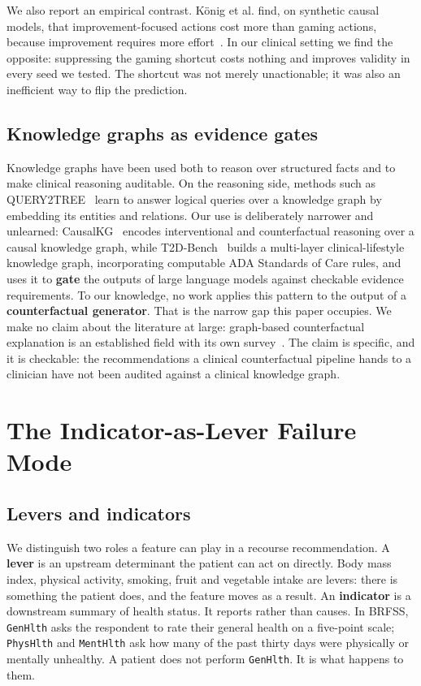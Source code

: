 \documentclass[conference]{IEEEtran}
\begin{document}
We also report an empirical contrast. K\"onig et al. find, on synthetic causal models, that improvement-focused actions cost more than gaming actions, because improvement requires more effort~\cite{konig2023}. In our clinical setting we find the opposite: suppressing the gaming shortcut costs nothing and improves validity in every seed we tested. The shortcut was not merely unactionable; it was also an inefficient way to flip the prediction.

\subsection{Knowledge graphs as evidence gates}
Knowledge graphs have been used both to reason over structured facts and to make clinical reasoning auditable. On the reasoning side, methods such as QUERY2TREE~\cite{query2tree2025} learn to answer logical queries over a knowledge graph by embedding its entities and relations. Our use is deliberately narrower and unlearned: CausalKG~\cite{causalkg2022} encodes interventional and counterfactual reasoning over a causal knowledge graph, while T2D-Bench~\cite{t2dbench2026} builds a multi-layer clinical-lifestyle knowledge graph, incorporating computable ADA Standards of Care rules, and uses it to \textbf{gate} the outputs of large language models against checkable evidence requirements. To our knowledge, no work applies this pattern to the output of a \textbf{counterfactual generator}. That is the narrow gap this paper occupies. We make no claim about the literature at large: graph-based counterfactual explanation is an established field with its own survey~\cite{pradoromero2024}. The claim is specific, and it is checkable: the recommendations a clinical counterfactual pipeline hands to a clinician have not been audited against a clinical knowledge graph.

\section{The Indicator-as-Lever Failure Mode}
\subsection{Levers and indicators}
We distinguish two roles a feature can play in a recourse recommendation. A \textbf{lever} is an upstream determinant the patient can act on directly. Body mass index, physical activity, smoking, fruit and vegetable intake are levers: there is something the patient does, and the feature moves as a result. An \textbf{indicator} is a downstream summary of health status. It reports rather than causes. In BRFSS, \texttt{GenHlth} asks the respondent to rate their general health on a five-point scale; \texttt{PhysHlth} and \texttt{MentHlth} ask how many of the past thirty days were physically or mentally unhealthy. A patient does not perform \texttt{GenHlth}. It is what happens to them.
\end{document}
